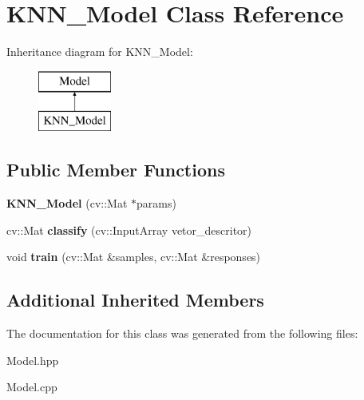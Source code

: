 \hypertarget{class_k_n_n___model}{\section{K\+N\+N\+\_\+\+Model Class Reference}
\label{class_k_n_n___model}
}
Inheritance diagram for K\+N\+N\+\_\+\+Model\+:\begin{figure}[H]
\begin{center}
\leavevmode
\includegraphics[height=2.000000cm]{class_k_n_n___model}
\end{center}
\end{figure}
\subsection*{Public Member Functions}
\begin{DoxyCompactItemize}
\item 
\hypertarget{class_k_n_n___model_a5ab1a3f5080368e42b9961fa6aa9f23e}{{\bfseries K\+N\+N\+\_\+\+Model} (cv\+::\+Mat $\ast$params)}\label{class_k_n_n___model_a5ab1a3f5080368e42b9961fa6aa9f23e}

\item 
\hypertarget{class_k_n_n___model_adafb1d8355243cd343d318470eefca66}{cv\+::\+Mat {\bfseries classify} (cv\+::\+Input\+Array vetor\+\_\+descritor)}\label{class_k_n_n___model_adafb1d8355243cd343d318470eefca66}

\item 
\hypertarget{class_k_n_n___model_a0b5ed5f2754161b1efde171939620fc1}{void {\bfseries train} (cv\+::\+Mat \&samples, cv\+::\+Mat \&responses)}\label{class_k_n_n___model_a0b5ed5f2754161b1efde171939620fc1}

\end{DoxyCompactItemize}
\subsection*{Additional Inherited Members}


The documentation for this class was generated from the following files\+:\begin{DoxyCompactItemize}
\item 
Model.\+hpp\item 
Model.\+cpp\end{DoxyCompactItemize}
